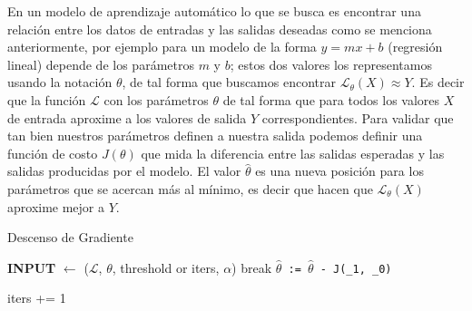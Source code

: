 
En un modelo de aprendizaje automático lo que se busca es encontrar una relación entre los datos de entradas y las salidas deseadas como se menciona anteriormente, por ejemplo para un modelo de la forma $y= mx+b$ (regresión lineal) depende de los parámetros  $m$ y $b$;  estos dos valores los representamos usando la notación $\theta$, de tal forma que buscamos encontrar $\mathcal{L}_{\theta} (X) \approx Y$. Es decir que la función $\mathcal{L}$ con los parámetros $\theta$ de tal forma que para todos los valores $X$ de entrada aproxime a los valores de salida $Y$ correspondientes. Para validar que tan bien nuestros parámetros definen a nuestra salida podemos definir una función de costo $J(\theta)$ que mida la diferencia entre las salidas esperadas y las salidas producidas por el modelo. El valor $\hat\theta$ es una nueva posición para los parámetros que se acercan más al mínimo, es decir que hacen que $\mathcal{L}_\theta(X)$ aproxime mejor a $Y$.



	

\begin{algorithm}[H] \caption{Descenso de Gradiente}\label{euclid}
\begin{algorithmic}[1]
\State \textbf{INPUT} $\gets$ ($\mathcal{L}$, $\theta$, threshold or iters, $\alpha$)
	\State	break
\Else
	\State \texttt{$\hat\theta$ := $\hat\theta$ - \alpha \frac{\partial}{\partial \theta} J(\theta_{1}, \theta_{0})}
	
\EndIf
\State iters += 1
\EndWhile
\end{algorithmic}
\end{algorithm}


